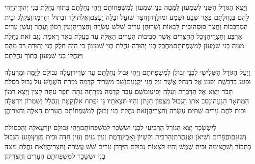 \documentclass[../main/main.tex]{subfiles}
\begin{document}
\begin{multicols*}{\ncols}
וַיֵּצֵא הַגּוֹרָל הַשֵּׁנִי לְשִׁמְעוֹן לְמַטֵּה בְנֵי שִׁמְעוֹן לְמִשְׁפְּחוֹתָם וַיְהִי נַחֲלָתָם בְּתוֹךְ נַחֲלַת בְּנֵי יְהוּדָה\PreVerseSpace{}וַיְהִי לָהֶם בְּנַחֲלָתָם בְּאֵר שֶׁבַע וּשְׁמַע\SubEnd{} וּמוֹלָדָה\PreVerseSpace{}וַחֲצַר שׁוּעָל וּבָלָה וָעָצֶם\PreVerseSpace{}וְאֶלְתּוֹלַד וּבְתוּל וְחָרְמָה\PreVerseSpace{}וְצִקְלַג וּבֵית הַמַּרְכָּבוֹת וַחֲצַר סוּסָה\PreVerseSpace{}וּבֵית לְבָאוֹת וְשָׁרוּחֶן עָרִים שְׁלֹשׁ עֶשְׂרֵה וְחַצְרֵיהֶן\PreVerseSpace{}עַיִן רִמּוֹן וָעֶתֶר וְעָשָׁן עָרִים אַרְבַּע וְחַצְרֵיהֶן\PreVerseSpace{}וְכָל הַחֲצֵרִים אֲשֶׁר סְבִיבוֹת הֶעָרִים הָאֵלֶּה עַד בַּעֲלַת בְּאֵר רָאמַת נֶגֶב זֹאת נַחֲלַת מַטֵּה בְנֵי שִׁמְעוֹן לְמִשְׁפְּחֹתָם\PreVerseSpace{}מֵחֶבֶל בְּנֵי יְהוּדָה נַחֲלַת בְּנֵי שִׁמְעוֹן כִּי הָיָה חֵלֶק בְּנֵי יְהוּדָה רַב מֵהֶם וַיִּנְחֲלוּ בְנֵי שִׁמְעוֹן בְּתוֹךְ נַחֲלָתָם\OpenSection{}\par
{}וַיַּעַל הַגּוֹרָל הַשְּׁלִישִׁי לִבְנֵי זְבוּלֻן לְמִשְׁפְּחֹתָם וַיְהִי גְּבוּל נַחֲלָתָם עַד שָׂרִיד\PreVerseSpace{}וְעָלָה גְבוּלָם לַיָּמָּה וּמַרְעֲלָה וּפָגַע בְּדַבָּשֶׁת וּפָגַע אֶל הַנַּחַל אֲשֶׁר עַל פְּנֵי יָקְנְעָם\PreVerseSpace{}וְשָׁב מִשָּׂרִיד קֵדְמָה מִזְרַח הַשֶּׁמֶשׁ עַל גְּבוּל כִּסְלֹת תָּבֹר וְיָצָא אֶל הַדָּבְרַת וְעָלָה יָפִיעַ\PreVerseSpace{}וּמִשָּׁם עָבַר קֵדְמָה מִזְרָחָה גִּתָּה חֵפֶר עִתָּה קָצִין וְיָצָא רִמּוֹן הַמְּתֹאָר הַנֵּעָה\PreVerseSpace{}וְנָסַב אֹתוֹ הַגְּבוּל מִצְּפוֹן חַנָּתֹן וְהָיוּ תֹּצְאֹתָיו גֵּי יִפְתַּח אֵל\PreVerseSpace{}וְקַטָּת וְנַהֲלָל וְשִׁמְרוֹן וְיִדְאֲלָה וּבֵית לָחֶם עָרִים שְׁתֵּים עֶשְׂרֵה וְחַצְרֵיהֶן\PreVerseSpace{}זֹאת נַחֲלַת בְּנֵי זְבוּלֻן לְמִשְׁפְּחוֹתָם הֶעָרִים הָאֵלֶּה וְחַצְרֵיהֶן\OpenSection{}\par
{}לְיִשְׂשָׂכָר יָצָא הַגּוֹרָל הָרְבִיעִי לִבְנֵי יִשְׂשָׂכָר לְמִשְׁפְּחוֹתָם\PreVerseSpace{}וַיְהִי גְּבוּלָם יִזְרְעֶאלָה וְהַכְּסוּלֹת וְשׁוּנֵם\PreVerseSpace{}וַחֲפָרַיִם וְשִׁיאֹן וַאֲנָחֲרַת\PreVerseSpace{}וְהָרַבִּית וְקִשְׁיוֹן וָאָבֶץ\PreVerseSpace{}וְרֶמֶת וְעֵין גַּנִּים וְעֵין חַדָּה וּבֵית פַּצֵּץ\PreVerseSpace{}וּפָגַע הַגְּבוּל בְּתָבוֹר וְשַׁחֲצִימָה\SubEnd{} וּבֵית שֶׁמֶשׁ וְהָיוּ תֹּצְאוֹת גְּבוּלָם הַיַּרְדֵּן עָרִים שֵׁשׁ עֶשְׂרֵה וְחַצְרֵיהֶן\PreVerseSpace{}זֹאת נַחֲלַת מַטֵּה בְנֵי יִשְׂשָׂכָר לְמִשְׁפְּחֹתָם הֶעָרִים וְחַצְרֵיהֶן\OpenSection{}\par

\end{multicols*}
\end{document}
